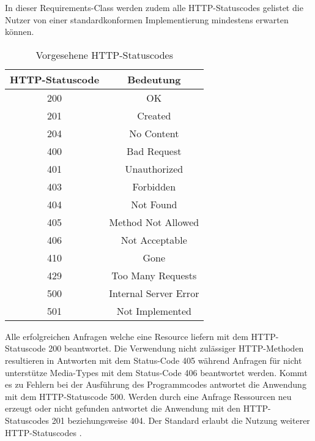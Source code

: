 In dieser Requirements-Class werden zudem alle HTTP-Statuscodes gelistet die Nutzer von einer standardkonformen Implementierung mindestens erwarten können. 
\begin{table}[H]
    \caption{Vorgesehene HTTP-Statuscodes \cite{ogc_api_processes_core}}
    \centering
    \begin{tabular}{c c} 
        HTTP-Statuscode & Bedeutung\\ 
        \hline
        200 & OK\\
        201 & Created\\
        204 & No Content\\
        400 & Bad Request\\
        401 & Unauthorized\\
        403 & Forbidden\\
        404 & Not Found\\
        405 & Method Not Allowed\\
        406 & Not Acceptable\\
        410 & Gone\\
        429 & Too Many Requests\\
        500 & Internal Server Error\\
        501 & Not Implemented\\
    \end{tabular}\label{httpcodes}
\end{table}
Alle erfolgreichen Anfragen welche eine Resource liefern mit dem HTTP-Statuscode 200 beantwortet. Die Verwendung nicht zulässiger HTTP-Methoden resultieren 
in Antworten mit dem Status-Code 405 während Anfragen für nicht unterstütze Media-Types mit dem Status-Code 406 beantwortet werden. Kommt es zu Fehlern bei der Ausführung 
des Programmcodes antwortet die Anwendung mit dem HTTP-Statuscode 500. Werden durch eine Anfrage Ressourcen neu erzeugt oder nicht gefunden antwortet die Anwendung mit 
den HTTP-Statuscodes 201 beziehungsweise 404. Der Standard erlaubt die Nutzung weiterer HTTP-Statuscodes \cite{ogc_api_processes_core}.


